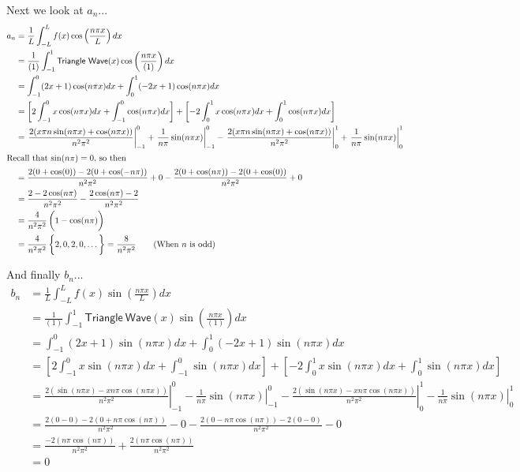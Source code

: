 \documentclass[letterpaper,8pt]{article}
\begin{document}
Next we look at $a_n$...
\begin{align*}
a_n &= \frac{1}{L} \int_{-L}^L f(x) \cos \left( \frac{n\pi x}{L} \right) dx \\
    &= \frac{1}{(1)} \int_{-1}^1 \mathsf{Triangle\ Wave}(x) \cos \left( \frac{n\pi x}{(1)} \right) dx \\
    &= \int_{-1}^0 (2x + 1) \cos ( n\pi x ) dx + \int_0^1 (-2x + 1) \cos ( n\pi x ) dx \\
    &= \left[ 2\int_{-1}^0 x \cos ( n\pi x ) dx + \int_{-1}^0 \cos ( n\pi x ) dx \right] + 
       \left[ -2\int_0^1 x \cos ( n\pi x ) dx + \int_0^1 \cos ( n\pi x ) dx \right] \\
    &= \left. \frac{2(x\pi n \sin ( n\pi x ) + \cos ( n\pi x ))}{n^2\pi^2} \right|_{-1}^0 + \left. \frac{1}{n \pi} \sin ( n\pi x ) \right|_{-1}^0 
       - \left. \frac{2(x\pi n \sin ( n\pi x ) + \cos ( n\pi x ))}{n^2\pi^2} \right|_0^1 + \left. \frac{1}{n \pi} \sin ( n\pi x ) \right|_0^1 \\
\intertext{Recall that $\sin ( n\pi) = 0$, so then}
   &= \frac{2(0 + \cos(0)) - 2(0 + \cos (-n\pi)) }{n^2\pi^2} + 0 - \frac{2(0 + \cos(n\pi)) - 2(0 + \cos (0)) }{n^2\pi^2} + 0 \\
   &= \frac{2 - 2\cos (n\pi) }{n^2\pi^2} - \frac{2\cos(n\pi) - 2}{n^2\pi^2} \\
   &= \frac{4}{n^2\pi^2} \left( 1 -  \cos (n\pi) \vphantom{\frac{1}{1}} \right) \\
   &= \frac{4}{n^2\pi^2} \left\{ 2, 0, 2, 0, \ldots \vphantom{\frac{1}{1}} \right\} = \frac{8}{n^2\pi^2} \qquad \text{(When $n$ is odd)} 
\end{align*}

And finally $b_n$...
\begin{align*}
b_n &= \frac{1}{L} \int_{-L}^L f(x) \sin \left( \frac{n\pi x}{L} \right) dx \\
    &= \frac{1}{(1)} \int_{-1}^1 \mathsf{Triangle\ Wave}(x) \sin \left( \frac{n\pi x}{(1)} \right) dx \\
    &= \int_{-1}^0 (2x + 1) \sin ( n\pi x ) dx + \int_0^1 (-2x + 1) \sin ( n\pi x ) dx \\
    &= \left[ 2\int_{-1}^0 x \sin ( n\pi x ) dx + \int_{-1}^0 \sin ( n\pi x ) dx \right] +
       \left[ -2\int_0^1 x \sin ( n\pi x ) dx + \int_0^1 \sin ( n\pi x ) dx \right] \\
    &= \left. \frac{2(\sin (n\pi x) - x n \pi \cos (n\pi x))}{n^2 \pi^2}\right|_{-1}^0 - \left. \frac{1}{n\pi} \sin (n\pi x) \right|_{-1}^0 - 
       \left. \frac{2(\sin (n\pi x) - x n \pi \cos (n\pi x))}{n^2 \pi^2}\right|_0^1 - \left. \frac{1}{n\pi} \sin (n\pi x) \right|_0^1  \\
    &= \frac{2(0 - 0) - 2(0 + n\pi \cos (n\pi)) }{n^2 \pi^2} - 0 - \frac{2(0 - n\pi \cos (n\pi)) - 2(0 - 0)}{n^2 \pi^2} - 0 \\
    &= \frac{  -2(n\pi \cos (n\pi)) }{n^2 \pi^2}  + \frac{2(n\pi \cos (n\pi)) }{n^2 \pi^2} \\
    &= 0
\end{align*}
\end{document}
